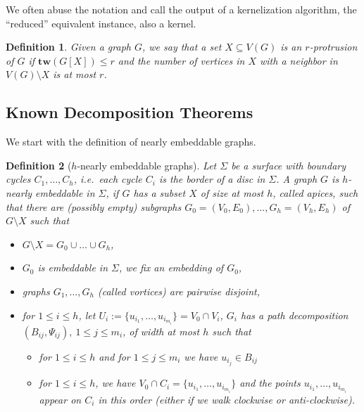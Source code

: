 \documentclass[11pt]{article}
\newtheorem{definition}{Definition}
\newcommand{\tw}{{\mathbf{tw}}}
\begin{document}
We often abuse the notation and call the output of a kernelization algorithm, the ``reduced'' equivalent instance, also a kernel. 
 







 \begin{definition}
Given a graph $G$, we say that a set $X\subseteq V(G)$ is an {\em $r$-protrusion} of $G$ if 
  $\tw(G[X])\leq r$ and the number of vertices in $X$ with a neighbor in $V(G)\setminus X$ is at most $r$. 
  \end{definition}

\subsection{Known Decomposition Theorems} We start with the definition of nearly embeddable graphs. 
\begin{definition}[$h$-nearly embeddable graphs]
Let $\Sigma$ be a surface with boundary cycles $C_1, \dots,C_h$, i.e.\ each cycle
$C_i$ is the border of a disc in $\Sigma$. A graph $G$ is
{\em $h$-nearly embeddable} in $\Sigma$, if $G$ has a subset $X$ of size at most $h$,
called {\em apices}, such that there are (possibly empty) subgraphs
$G_0=(V_0, E_0),\dots,G_h=(V_h, E_h)$ of $G\setminus X$ such that
\begin{itemize}
\setlength{\itemsep}{-2pt}
\item $G \setminus X=G_0\cup\dots\cup G_h$,
\item $G_0$ is embeddable in $\Sigma $, we fix an embedding of $G_0$,
\item graphs $G_1,\dots,G_h$ (called \emph{vortices}) are pairwise disjoint,
\item for $1\leq i \leq h$, let $U_i:= \{u_{i_1},\dots,u_{i_{m_i}}\} = V_0 \cap V_i$,  $G_i$ has a path decomposition 
$(B_{ij},\Psi_{ij}),\ 1\leq j \leq m_i$, of width at most $h$ such that

\begin{itemize}
\item for $1\leq  i \leq h$ and for $1 \leq j \leq m_i$ we have $u_{i_j} \in B_{ij}$
\item for $1\leq i \leq h$, we have $V_0 \cap C_i = \{u_{i_1},\dots,u_{i_{m_i}}\} $ and the points $u_{i_1},\dots,u_{i_{m_i}}$ appear on $C_i$ in this order (either if we walk clockwise or anti-clockwise).
\end{itemize}
\end{itemize}
\end{definition}
\end{document}
